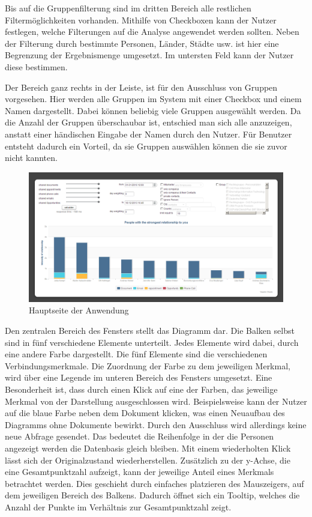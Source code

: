 Bis auf die Gruppenfilterung sind im dritten Bereich alle restlichen Filtermöglichkeiten vorhanden. Mithilfe von Checkboxen kann der Nutzer festlegen, welche Filterungen auf die Analyse angewendet werden sollten. Neben der Filterung durch bestimmte Personen, Länder, Städte usw. ist hier eine Begrenzung der Ergebnismenge umgesetzt. Im untersten Feld kann der Nutzer diese bestimmen.

Der Bereich ganz rechts in der Leiste, ist für den Ausschluss von Gruppen vorgesehen. Hier werden alle Gruppen im System mit einer Checkbox und einem Namen dargestellt. Dabei können beliebig viele Gruppen ausgewählt werden. Da die Anzahl der Gruppen überschaubar ist, entschied man sich alle anzuzeigen, anstatt einer händischen Eingabe der Namen durch den Nutzer. Für Benutzer entsteht dadurch ein Vorteil, da sie Gruppen auswählen können die sie zuvor nicht kannten.

\begin{figure}[htbp]
\centering
\includegraphics[width=\textwidth]{pics/final_screen.png}
\caption{Hauptseite der Anwendung}
\label{ergebniss_oberflaeche_haupt}
\end{figure}

Den zentralen Bereich des Fensters stellt das Diagramm dar. Die Balken selbst sind in fünf verschiedene Elemente unterteilt. Jedes Elemente wird dabei, durch eine andere Farbe dargestellt. Die fünf Elemente sind die verschiedenen Verbindungsmerkmale. Die Zuordnung der Farbe zu dem jeweiligen Merkmal, wird über eine Legende im unteren Bereich des Fensters umgesetzt. Eine Besonderheit ist, dass durch einen Klick auf eine der Farben, das jeweilige Merkmal von der Darstellung ausgeschlossen wird. Beispielsweise kann der Nutzer auf die blaue Farbe neben dem Dokument klicken, was einen Neuaufbau des Diagramms ohne Dokumente bewirkt. Durch den Ausschluss wird allerdings keine neue Abfrage gesendet. Das  bedeutet die Reihenfolge in der die Personen angezeigt werden die Datenbasis gleich  bleiben. Mit einem wiederholten Klick lässt sich der Originalzustand wiederherstellen. Zusätzlich zu der y-Achse, die eine Gesamtpunktzahl aufzeigt, kann der jeweilige Anteil eines Merkmals betrachtet werden. Dies geschieht durch einfaches platzieren des Mauszeigers, auf dem jeweiligen Bereich des Balkens. Dadurch öffnet sich ein Tooltip, welches die Anzahl der Punkte im Verhältnis zur Gesamtpunktzahl zeigt.


